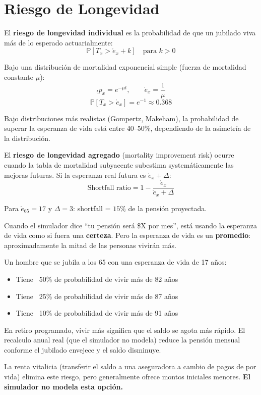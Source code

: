 \documentclass[11pt,a4paper]{report}
\begin{document}
\section{Riesgo de Longevidad}

\begin{tcolorbox}[colback=blue!5!white, colframe=blue!75!black, title=\textbf{Definici\'on Formal: Riesgo de Longevidad Individual y Agregado}]
El \textbf{riesgo de longevidad individual} es la probabilidad de que un jubilado viva m\'as de lo esperado actuarialmente:
\[
  \mathbb{P}[T_x > \mathring{e}_x + k] \quad \text{para } k > 0
\]

Bajo una distribuci\'on de mortalidad exponencial simple (fuerza de mortalidad constante $\mu$):
\[
  {}_tp_x = e^{-\mu t}, \qquad \mathring{e}_x = \frac{1}{\mu}
\]
\[
  \mathbb{P}[T_x > \mathring{e}_x] = e^{-1} \approx 0.368
\]

Bajo distribuciones m\'as realistas (Gompertz, Makeham), la probabilidad de superar la esperanza de vida est\'a entre 40--50\%, dependiendo de la asimetr\'ia de la distribuci\'on.

El \textbf{riesgo de longevidad agregado} (mortality improvement risk) ocurre cuando la tabla de mortalidad subyacente subestima system\'aticamente las mejoras futuras. Si la esperanza real futura es $\mathring{e}_x + \Delta$:
\[
  \text{Shortfall ratio} = 1 - \frac{\mathring{e}_x}{\mathring{e}_x + \Delta}
\]

Para $\mathring{e}_{65} = 17$ y $\Delta = 3$: shortfall = $15\%$ de la pensi\'on proyectada.
\end{tcolorbox}

\begin{tcolorbox}[colback=green!5!white, colframe=green!50!black, title=\textbf{Intuici\'on: La Mitad de los Jubilados Vivir\'an M\'as de lo Esperado}]
Cuando el simulador dice ``tu pensi\'on ser\'a \$X por mes'', est\'a usando la esperanza de vida como si fuera una \textbf{certeza}. Pero la esperanza de vida es un \textbf{promedio}: aproximadamente la mitad de las personas vivir\'an m\'as.

Un hombre que se jubila a los 65 con una esperanza de vida de 17 a\~nos:
\begin{itemize}
  \item Tiene ~50\% de probabilidad de vivir m\'as de 82 a\~nos
  \item Tiene ~25\% de probabilidad de vivir m\'as de 87 a\~nos
  \item Tiene ~10\% de probabilidad de vivir m\'as de 91 a\~nos
\end{itemize}

En retiro programado, vivir m\'as significa que el saldo se agota m\'as r\'apido. El recalculo anual real (que el simulador no modela) reduce la pensi\'on mensual conforme el jubilado envejece y el saldo disminuye.

La renta vitalicia (transferir el saldo a una aseguradora a cambio de pagos de por vida) elimina este riesgo, pero generalmente ofrece montos iniciales menores. \textbf{El simulador no modela esta opci\'on.}
\end{tcolorbox}
\end{document}
